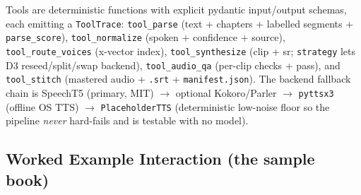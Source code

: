 \documentclass[12pt,a4paper]{article}
\begin{document}
Tools are deterministic functions with explicit pydantic input/output schemas, each emitting a \texttt{ToolTrace}: \texttt{tool\_parse} (text + chapters + labelled segments + \texttt{parse\_score}), \texttt{tool\_normalize} (spoken + confidence + source), \texttt{tool\_route\_voices} (x-vector index), \texttt{tool\_synthesize} (clip + sr; \texttt{strategy} lets D3 reseed/split/swap backend), \texttt{tool\_audio\_qa} (per-clip checks + pass), and \texttt{tool\_stitch} (mastered audio + \texttt{.srt} + \texttt{manifest.json}). The backend fallback chain is SpeechT5 (primary, MIT) $\rightarrow$ optional Kokoro/Parler $\rightarrow$ \texttt{pyttsx3} (offline OS TTS) $\rightarrow$ \texttt{PlaceholderTTS} (deterministic low-noise floor so the pipeline \emph{never} hard-fails and is testable with no model).

\subsection{Worked Example Interaction (the sample book)}
\end{document}
